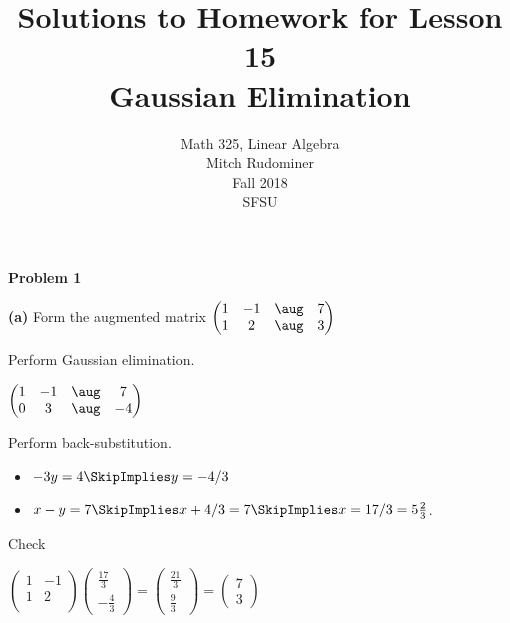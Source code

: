 \documentclass[oneside,12pt]{amsart}
\begin{document}
\title{Solutions to Homework for Lesson 15 \\ Gaussian Elimination}
\author{Math 325, Linear Algebra \\ Mitch Rudominer \\ Fall 2018 \\ SFSU }
\date{}

\maketitle


\textbf{Problem 1}

\bigskip


\textbf{(a)} Form the augmented matrix
$
\begin{pmatrix}
 1 & -1 &  \aug & 7  \\
 1 &  2 &  \aug & 3  \\
\end{pmatrix}
$

Perform Gaussian elimination.


\bigskip

$
\begin{pmatrix}
 1 & -1 &  \aug & 7  \\
 0 &  3 &  \aug & -4  \\
\end{pmatrix}
$


\bigskip

Perform back-substitution.

\begin{itemize}
\item $-3y = 4  \SkipImplies y = -4/3$
\item $x-y=7 \SkipImplies x+4/3=7 \SkipImplies x = 17/3 = 5 \frac{2}{3}$.
\end{itemize}

\bigskip

Check

\bigskip

$
\begin{pmatrix}
 1 & -1 \\
 1 & 2 \\
\end{pmatrix}
\begin{pmatrix}
 \frac{17}{3} \\[6pt]
 -\frac{4}{3}
\end{pmatrix}
=
\begin{pmatrix}
 \frac{21}{3} \\[6pt]
 \frac{9}{3}
\end{pmatrix}
=
\begin{pmatrix}
 7 \\
3
\end{pmatrix}
$
\end{document}
